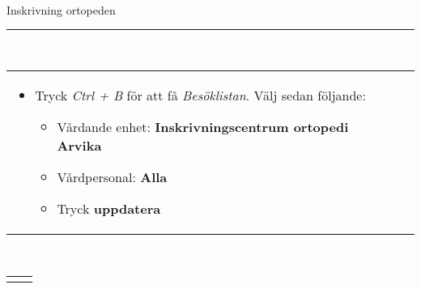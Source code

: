 \documentclass[13pt,a4paper,oneside]{article}
\begin{document}
{
\ \\
Inskrivning ortopeden\hrule
\ \\
\begin{tabular}{ l l }
 \begin{minipage}{12cm} \begin{itemize}
  \item Tryck \textit{Ctrl + B} för att få \textit{Besöklistan}. Välj sedan följande:
\begin{itemize}
  \item Vårdande enhet: \textbf{Inskrivningscentrum ortopedi Arvika}
  \item Vårdpersonal: \textbf{Alla}
  \item Tryck \textbf{uppdatera}
\end{itemize}\end{itemize} \end{minipage} &  \begin{minipage}{12cm}\end{minipage} \\ 
\end{tabular}\\
\begin{tabular}{ l l }
  \begin{minipage}{12cm}\begin{itemize}


\end{itemize}
\end{minipage}
\end{tabular}}
\end{document}
